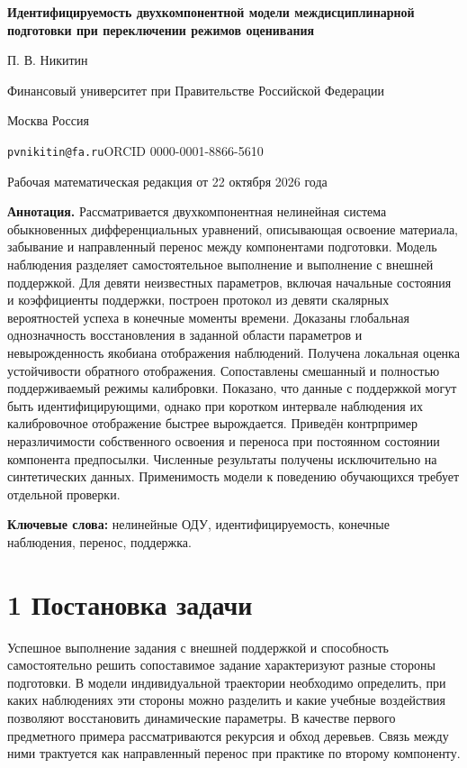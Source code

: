 \documentclass[11pt,a4paper]{article}
\begin{document}

\begin{center}{\Large\bfseries Идентифицируемость двухкомпонентной модели междисциплинарной подготовки при переключении режимов оценивания}\par\medskip

П. В. Никитин\par Финансовый университет при Правительстве Российской Федерации\par Москва Россия\par

\texttt{pvnikitin@fa.ru}\quad ORCID 0000-0001-8866-5610\par

\small Рабочая математическая редакция от 22 октября 2026 года\end{center}

\noindent\textbf{Аннотация.} Рассматривается двухкомпонентная нелинейная система обыкновенных дифференциальных уравнений, описывающая освоение материала, забывание и направленный перенос между компонентами подготовки. Модель наблюдения разделяет самостоятельное выполнение и выполнение с внешней поддержкой. Для девяти неизвестных параметров, включая начальные состояния и коэффициенты поддержки, построен протокол из девяти скалярных вероятностей успеха в конечные моменты времени. Доказаны глобальная однозначность восстановления в заданной области параметров и невырожденность якобиана отображения наблюдений. Получена локальная оценка устойчивости обратного отображения. Сопоставлены смешанный и полностью поддерживаемый режимы калибровки. Показано, что данные с поддержкой могут быть идентифицирующими, однако при коротком интервале наблюдения их калибровочное отображение быстрее вырождается. Приведён контрпример неразличимости собственного освоения и переноса при постоянном состоянии компонента предпосылки. Численные результаты получены исключительно на синтетических данных. Применимость модели к поведению обучающихся требует отдельной проверки.\par

\noindent\textbf{Ключевые слова:} нелинейные ОДУ, идентифицируемость, конечные наблюдения, перенос, поддержка.

\section*{1 Постановка задачи}

Успешное выполнение задания с внешней поддержкой и способность самостоятельно решить сопоставимое задание характеризуют разные стороны подготовки. В модели индивидуальной траектории необходимо определить, при каких наблюдениях эти стороны можно разделить и какие учебные воздействия позволяют восстановить динамические параметры. В качестве первого предметного примера рассматриваются рекурсия и обход деревьев. Связь между ними трактуется как направленный перенос при практике по второму компоненту.\par
\end{document}
